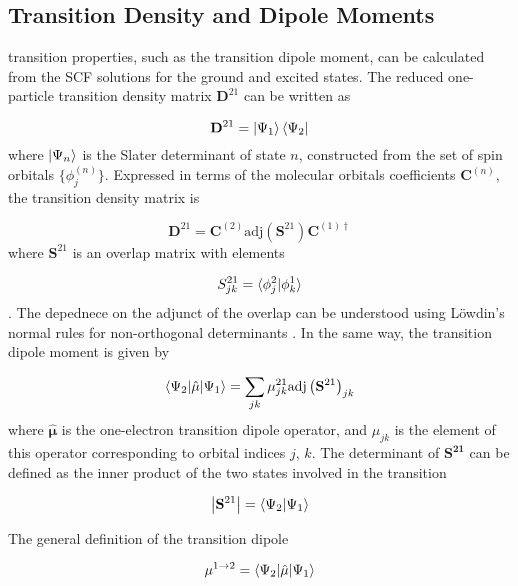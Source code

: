 \subsection{Transition Density and Dipole Moments}
\label{subsec:dscf_transition_density}
\dscf transition properties, such as the transition dipole moment, can be calculated from
the SCF solutions for the ground and excited states. The reduced one-particle transition
density matrix $\mathbf{D}^{21}$ can be written as

\begin{equation}
\mathbf{D}^{21} = \ket{\Psi_1} \bra{\Psi_2}
\end{equation}
%
where $\ket{\Psi_n}$ is the Slater determinant of state $n$, constructed from the
set of spin orbitals $\{ \phi_{j}^{\left(n\right)} \} $. Expressed 
in terms of the molecular orbitals coefficients $\mathbf{C}^{\left(n\right)}$, the
transition density matrix is

\begin{equation}
\mathbf{D}^{21} = \mathbf{C}^{\left(2\right)} \text{adj}\left(\mathbf{S}^{21}\right) \mathbf{C}^{\left(1\right) \dagger}
\end{equation}
%
where $\mathbf{S}^{21}$ is an overlap matrix with elements 

\begin{equation}
S^{21}_{jk} = \braket{\phi^2_j|\phi^1_k}
\end{equation}
%
. The depednece on the adjunct of the overlap
can be understood using L{\"o}wdin's normal rules for non-orthogonal determinants \cite{Lowdin1955}.
In the same way, the transition dipole moment is given by

\begin{equation}
\braket{\Psi_2|\hat{\mathbf{\mu}}|\Psi_1} = \sum_{jk} \mathbf{\mu}_{jk}^{21} \text{adj} \left( \mathbf{S}^{21}\right)_{jk}
\end{equation}
%
where $\hat{\mathbf{\mu}}$ is the one-electron transition dipole operator, and
$\mu_{jk}$ is the element of this operator corresponding to orbital indices $j$, $k$.
The determinant of $\mathbf{S^{21}}$ can be defined as the inner product of the 
two states involved in the transition

\begin{equation}
\left\lvert {\mathbf{S}^{21}} \right\rvert = \braket{\Psi_2|\Psi_1}
\end{equation}

The general definition of the transition dipole

\begin{equation}
\mathbf{\mu}^{1\rightarrow2} = \braket{\Psi_2|\hat{\mathbf{\mu}}|\Psi_1}
\end{equation}

